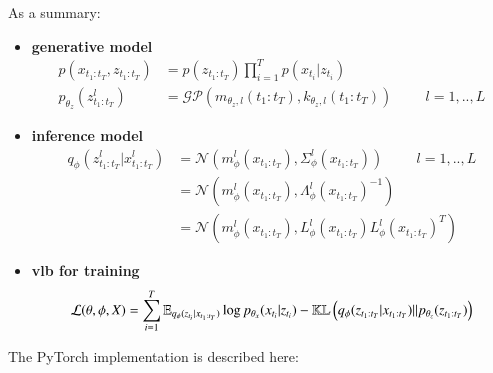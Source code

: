 As a summary:
\begin{tcolorbox}[colback=blue!5!white,colframe=black!75!black,title=Gaussian Process VAEs]
\begin{itemize}
    \item \textbf{generative model}
    \begin{align}
        \label{gen_model_gpvae}
        p(x_{t_1:t_T}, z_{t_1:t_T}) &= p(z_{t_1:t_T}) \prod_{i=1}^T p(x_{t_i} \vert z_{t_{i}}) \\
        p_{\theta_z}(z_{t_1:t_T}^l) &= \mathcal{GP}(m_{\theta_z, l}(t_1:t_T), k_{\theta_z, l}(t_1:t_T)) \hspace{1cm} l=1,..,L
    \end{align}
    \item \textbf{inference model}
    \begin{align}
        \label{inf_model_gpvae}
        q_\phi(z_{t_1:t_T}^l \vert x_{t_1:t_T}^l) &= \mathcal{N}(m_{\phi}^l(x_{t_1:t_T}), \Sigma_{\phi}^l(x_{t_1:t_T})) \hspace{1cm} l=1,..,L \\
        &= \mathcal{N}(m_{\phi}^l(x_{t_1:t_T}), \Lambda_{\phi}^l(x_{t_1:t_T})^{-1}) \\
        &= \mathcal{N}(m_{\phi}^l(x_{t_1:t_T}), L_{\phi}^l(x_{t_1:t_T})L_{\phi}^l(x_{t_1:t_T})^T)
    \end{align}
    \item \textbf{\gls{vlb} for training}
    \begin{align}
        \label{vlb_gpvae}
        \mathcal{L}(\theta, \phi, X) = \sum_{i=1}^T \mathbb{E}_{q_{\phi}(z_{t_i} \vert x_{t_1:t_T})} \log{p_{\theta_x}(x_{t_i} \vert z_{t_i})} - \mathbb{KL}\left( q_{\phi}(z_{t_1:t_T} \vert x_{t_1:t_T}) \vert\vert p_{\theta_z}(z_{t_1:t_T}) \right) 
    \end{align}
\end{itemize}
\end{tcolorbox}

The PyTorch implementation is described here:



%
%
%
%

